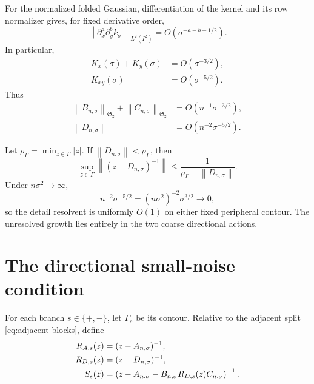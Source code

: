 \documentclass[11pt]{article}
\theoremstyle{definition}
\theoremstyle{remark}
\newcommand{\HS}{\mathfrak S_2}
\newcommand{\norm}[1]{\left\lVert #1\right\rVert}
\begin{document}
For the normalized folded Gaussian, differentiation of the kernel and its
row normalizer gives, for fixed derivative order,
\begin{equation}
 \norm{\partial_x^a\partial_y^b k_\sigma}_{L^2(I^2)}
 =O(\sigma^{-a-b-1/2}).
 \label{eq:gaussian-all-derivatives}
\end{equation}
In particular,
\begin{align}
 K_x(\sigma)+K_y(\sigma)&=O(\sigma^{-3/2}),
 \label{eq:first-derivatives}\\
 K_{xy}(\sigma)&=O(\sigma^{-5/2}).
 \label{eq:mixed-derivative}
\end{align}
Thus
\begin{align}
 \norm{B_{n,\sigma}}_{\HS}
 +\norm{C_{n,\sigma}}_{\HS}
 &=O(n^{-1}\sigma^{-3/2}),
 \label{eq:coupling-clock}\\
 \norm{D_{n,\sigma}}
 &=O(n^{-2}\sigma^{-5/2}).
 \label{eq:detail-clock}
\end{align}

Let $\rho_\Gamma=\min_{z\in\Gamma}|z|$.  If
$\norm{D_{n,\sigma}}<\rho_\Gamma$, then
\begin{equation}
 \sup_{z\in\Gamma}\norm{(z-D_{n,\sigma})^{-1}}
 \le\frac1{\rho_\Gamma-\norm{D_{n,\sigma}}}.
 \label{eq:detail-resolvent}
\end{equation}
Under $n\sigma^2\to\infty$,
\begin{equation}
 n^{-2}\sigma^{-5/2}
 =(n\sigma^2)^{-2}\sigma^{3/2}\longrightarrow0,
 \label{eq:detail-vanishes}
\end{equation}
so the detail resolvent is uniformly $O(1)$ on either fixed peripheral
contour.  The unresolved growth lies entirely in the two coarse
directional actions.

\section{The directional small-noise condition}
\label{sec:directional-condition}

For each branch $s\in\{+,-\}$, let $\Gamma_s$ be its contour.  Relative to
the adjacent split \eqref{eq:adjacent-blocks}, define
\begin{align}
 R_{A,s}(z)&=(z-A_{n,\sigma})^{-1},
 \notag\\
 R_{D,s}(z)&=(z-D_{n,\sigma})^{-1},
 \notag\\
 S_s(z)&=
 \left(z-A_{n,\sigma}
 -B_{n,\sigma}R_{D,s}(z)C_{n,\sigma}\right)^{-1}.
 \label{eq:branch-schur-objects}
\end{align}
\end{document}
